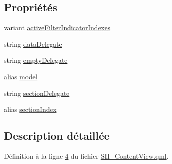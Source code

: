 \subsection*{Propriétés}
\begin{DoxyCompactItemize}
\item 
variant \hyperlink{classSH__ContentView_a7ea5cf24986d3fb77ebcdfc9c3a3822a}{active\-Filter\-Indicator\-Indexes}
\item 
string \hyperlink{classSH__ContentView_a4587c7cc61cefdb55d96e2f3b05e02b4}{data\-Delegate}
\item 
string \hyperlink{classSH__ContentView_a243657fbb9155fd4af8e14c225795aa8}{empty\-Delegate}
\item 
alias \hyperlink{classSH__ContentView_ace8288902fb10eb93de67293bc8ac57c}{model}
\item 
string \hyperlink{classSH__ContentView_a5a5fa8f42e23b857494f2c88b39d1177}{section\-Delegate}
\item 
alias \hyperlink{classSH__ContentView_a554c2eaf9b48986c87fa8fb0178c0d1d}{section\-Index}
\end{DoxyCompactItemize}


\subsection{Description détaillée}


Définition à la ligne \hyperlink{SH__ContentView_8qml_source_l00004}{4} du fichier \hyperlink{SH__ContentView_8qml_source}{S\-H\-\_\-\-Content\-View.\-qml}.



